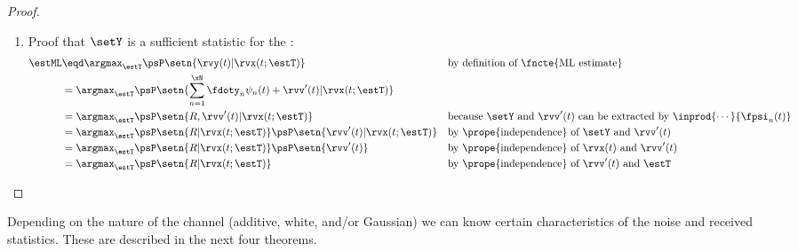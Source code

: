 \begin{proof}
\begin{enumerate}
\item Proof that $\setY$ is a sufficient statistic for the :
\begin{align*}
   \estML
     &\eqd \argmax_{\estT} \psP\setn{\rvy(t)|\rvx(t;\estT)}
     &&    \text{by definition of \fncte{ML estimate}}
   \\&=    \argmax_{\estT} \psP\setn{\sum_{n=1}^\xN\fdoty_n\psi_n(t)+\rvv'(t)|\rvx(t;\estT)}
   \\&=    \argmax_{\estT} \psP\setn{R,\rvv'(t)|\rvx(t;\estT)}
     &&    \text{because $\setY$ and $\rvv'(t)$ can be extracted by  $\inprod{\cdots}{\fpsi_n(t)}$}
   \\&=    \argmax_{\estT} \psP\setn{R|\rvx(t;\estT)}\psP\setn{\rvv'(t)|\rvx(t;\estT)}
     &&    \text{by \prope{independence} of $\setY$ and $\rvv'(t)$}
   \\&=    \argmax_{\estT} \psP\setn{R|\rvx(t;\estT)}\psP\setn{\rvv'(t)}
     &&    \text{by \prope{independence} of $\rvx(t)$ and $\rvv'(t)$}
   \\&=    \argmax_{\estT} \psP\setn{R|\rvx(t;\estT)}
     &&    \text{by \prope{independence} of $\rvv'(t)$ and $\estT$}
\end{align*}
\end{enumerate}
\end{proof}


Depending on the nature of the channel (additive, white, and/or Gaussian)
we can know certain characteristics of the noise and received statistics.
These are described in the next four theorems.


